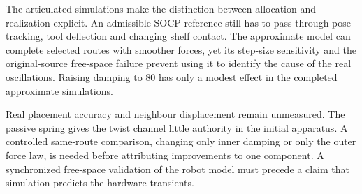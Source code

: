 The articulated simulations make the distinction between allocation and realization explicit. An admissible SOCP reference still has to pass through pose tracking, tool deflection and changing shelf contact. The approximate model can complete selected routes with smoother forces, yet its step-size sensitivity and the original-source free-space failure prevent using it to identify the cause of the real oscillations. Raising damping to $80$ has only a modest effect in the completed approximate simulations.

Real placement accuracy and neighbour displacement remain unmeasured. The passive spring gives the twist channel little authority in the initial apparatus. A controlled same-route comparison, changing only inner damping or only the outer force law, is needed before attributing improvements to one component. A synchronized free-space validation of the robot model must precede a claim that simulation predicts the hardware transients.

